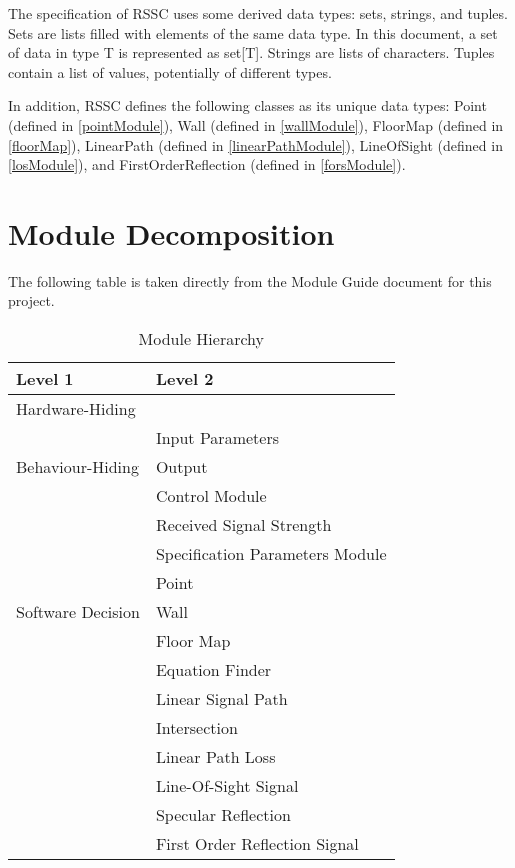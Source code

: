 \documentclass[12pt, titlepage]{article}
\begin{document}
\noindent
The specification of RSSC uses some derived data types: sets, strings, and
tuples. Sets are lists filled with elements of the same data type. In this document, a set of data in type T is represented as set[T]. Strings are lists of characters. Tuples contain a list of values, potentially of different types.

In addition, RSSC defines the following classes as its unique data types: Point (defined in
\autoref{pointModule}), Wall (defined in \autoref{wallModule}), FloorMap (defined in \autoref{floorMap}), LinearPath (defined in \autoref{linearPathModule}), LineOfSight (defined in \autoref{losModule}), and FirstOrderReflection (defined in \autoref{forsModule}). 

\section{Module Decomposition}

The following table is taken directly from the Module Guide document for this project.

\begin{table}[h!]
\centering
\begin{tabular}{p{} p{}}
\toprule
\textbf{Level 1} & \textbf{Level 2}\\
\midrule

{Hardware-Hiding} & ~ \\
\midrule

\multirow{3}{0.3\textwidth}{Behaviour-Hiding} & Input Parameters\\
& Output\\
& Control Module\\
& Received Signal Strength\\
& Specification Parameters Module\\
\midrule

\multirow{3}{0.3\textwidth}{Software Decision} & Point\\
& Wall\\
& Floor Map\\
& Equation Finder\\
& Linear Signal Path\\
& Intersection\\
& Linear Path Loss\\
& Line-Of-Sight Signal\\
& Specular Reflection\\
& First Order Reflection Signal\\
\bottomrule

\end{tabular}
\caption{Module Hierarchy}
\label{TblMH}
\end{table}
\end{document}
